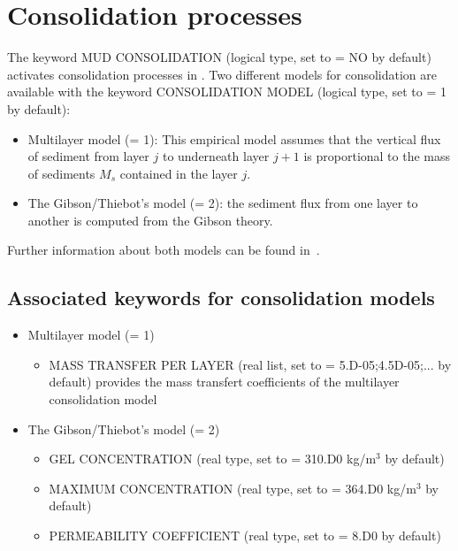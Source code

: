 \section{Consolidation processes}
The keyword {\ttfamily MUD CONSOLIDATION} (logical type, set to {\ttfamily = NO} by default) activates consolidation processes in \sisyphe{}. Two different models for consolidation are available with the keyword {\ttfamily CONSOLIDATION MODEL} (logical type, set to {\ttfamily = 1} by default):
\begin{itemize}
\item Multilayer model ({\ttfamily = 1}): This empirical model assumes that the vertical flux of
sediment from layer $j$ to underneath layer $j+1$ is proportional to the mass of
sediments $M_s$ contained in the layer $j$.
\item The Gibson/Thiebot's model ({\ttfamily = 2}): the sediment flux from one layer
to another is computed from the Gibson theory.
\end{itemize}

Further information about both models can be found in~\cite{Lan12}.

\subsection{Associated keywords for consolidation models}
\begin{itemize}
\item Multilayer model ({\ttfamily = 1})
\begin{itemize}
\item {\ttfamily MASS TRANSFER PER LAYER} (real list, set to {\ttfamily = 5.D-05;4.5D-05;...} by default) provides the mass transfert coefficients of the multilayer consolidation model %
\end{itemize} 
\item The Gibson/Thiebot's model ({\ttfamily = 2})
\begin{itemize}
\item {\ttfamily GEL CONCENTRATION} (real type, set to {\ttfamily = 310.D0} kg/m$^3$ by default)
\item {\ttfamily MAXIMUM CONCENTRATION} (real type, set to {\ttfamily = 364.D0} kg/m$^3$ by default)
\item {\ttfamily PERMEABILITY COEFFICIENT} (real type, set to {\ttfamily = 8.D0} by default) %
\end{itemize}
\end{itemize} 

